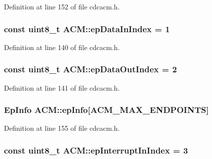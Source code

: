\-Definition at line 152 of file cdcacm.\-h.

\hypertarget{class_a_c_m_a5917b5098e529fafe67a53e03f1e7011}{
\subsubsection[{ep\-Data\-In\-Index}]{\setlength{\rightskip}{0pt plus 5cm}const uint8\-\_\-t {\bf \-A\-C\-M\-::ep\-Data\-In\-Index} = 1}}\label{class_a_c_m_a5917b5098e529fafe67a53e03f1e7011}


\-Definition at line 140 of file cdcacm.\-h.

\hypertarget{class_a_c_m_a0dc940bc4f1bed7525bb768e37e6cb61}{
\subsubsection[{ep\-Data\-Out\-Index}]{\setlength{\rightskip}{0pt plus 5cm}const uint8\-\_\-t {\bf \-A\-C\-M\-::ep\-Data\-Out\-Index} = 2}}\label{class_a_c_m_a0dc940bc4f1bed7525bb768e37e6cb61}


\-Definition at line 141 of file cdcacm.\-h.

\hypertarget{class_a_c_m_a60fb6a365b78fb80a4a9842e364cf1a3}{
\subsubsection[{ep\-Info}]{\setlength{\rightskip}{0pt plus 5cm}\-Ep\-Info {\bf \-A\-C\-M\-::ep\-Info}\mbox{[}{\bf \-A\-C\-M\-\_\-\-M\-A\-X\-\_\-\-E\-N\-D\-P\-O\-I\-N\-T\-S}\mbox{]}}}\label{class_a_c_m_a60fb6a365b78fb80a4a9842e364cf1a3}


\-Definition at line 155 of file cdcacm.\-h.

\hypertarget{class_a_c_m_a9b32207fdf256e5f8553ba4048b64307}{
\subsubsection[{ep\-Interrupt\-In\-Index}]{\setlength{\rightskip}{0pt plus 5cm}const uint8\-\_\-t {\bf \-A\-C\-M\-::ep\-Interrupt\-In\-Index} = 3}}\label{class_a_c_m_a9b32207fdf256e5f8553ba4048b64307}


